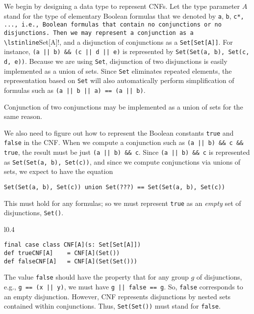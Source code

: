 We begin by designing a data type to represent CNFs. Let the type
parameter $A$ stand for the type of elementary Boolean formulas that
we denoted by \lstinline!a!, \lstinline!b!, \lstinline*!c*, ...,
i.e., Boolean formulas that contain no conjunctions or no disjunctions.
Then we may represent a conjunction as a \lstinline!Set[A]!, and
a disjunction of conjunctions as a \lstinline!Set[Set[A]]!. For instance,
\lstinline!(a || b) && (c || d || e)! is represented by \lstinline!Set(Set(a, b), Set(c, d, e))!.
Because we are using \lstinline!Set!, disjunction of two disjunctions
is easily implemented as a union of sets. Since \lstinline!Set! eliminates
repeated elements, the representation based on \lstinline!Set! will
also automatically perform simplification of formulas such as \lstinline!(a || b || a) == (a || b)!.

Conjunction of two conjunctions may be implemented as a union of sets
for the same reason.

We also need to figure out how to represent the Boolean constants
\lstinline!true! and \lstinline!false! in the CNF. When we compute
a conjunction such as \lstinline!(a || b) && c && true!, the result
must be just \lstinline!(a || b) && c!. Since \lstinline!(a || b) && c!
is represented as \lstinline!Set(Set(a, b), Set(c))!, and since we
compute conjunctions via unions of sets, we expect to have the equation
\begin{lstlisting}
Set(Set(a, b), Set(c)) union Set(???) == Set(Set(a, b), Set(c))
\end{lstlisting}
This must hold for any formulas; so we must represent \lstinline!true!
as an \emph{empty} set of disjunctions, \lstinline!Set()!.

\begin{wrapfigure}{l}{0.4\columnwidth}%
\vspace{-0.6\baselineskip}
\begin{lstlisting}
final case class CNF[A](s: Set[Set[A]])
def trueCNF[A]    = CNF[A](Set())
def falseCNF[A]   = CNF[A](Set(Set()))
\end{lstlisting}
\vspace{-0.8\baselineskip}
\end{wrapfigure}%

The value \lstinline!false! should have the property that for any
group $g$ of disjunctions, e.g., \lstinline!g == (x || y)!, we must
have \lstinline!g || false == g!. So, \lstinline!false! corresponds
to an empty disjunction. However, CNF represents disjunctions by nested
sets contained within conjunctions. Thus, \lstinline!Set(Set())!
must stand for \lstinline!false!.

